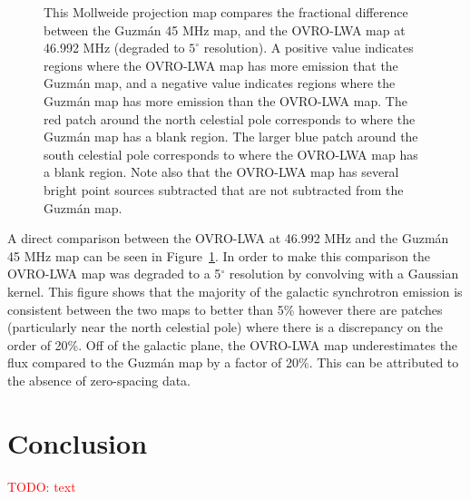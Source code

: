 \documentclass[twocolumn]{aastex61}
\newcommand{\todo}[1]{\textcolor{red}{TODO: #1}\PackageWarning{TODO:}{#1!}}
\begin{document}
\begin{figure}[t]
    \caption{
        This Mollweide projection map compares the fractional difference between the Guzm\'{a}n 45
        MHz map, and the OVRO-LWA map at 46.992 MHz (degraded to $5^\circ$ resolution). A positive
        value indicates regions where the OVRO-LWA map has more emission that the Guzm\'{a}n map,
        and a negative value indicates regions where the Guzm\'{a}n map has more emission than the
        OVRO-LWA map. The red patch around the north celestial pole corresponds to where the
        Guzm\'{a}n map has a blank region.  The larger blue patch around the south celestial pole
        corresponds to where the OVRO-LWA map has a blank region. Note also that the OVRO-LWA map
        has several bright point sources subtracted that are not subtracted from the Guzm\'{a}n map.
    }
    \label{fig:guzman-comparison}
\end{figure}

A direct comparison between the OVRO-LWA at 46.992 MHz and the Guzm\'{a}n 45 MHz map
\citep{2011A&A...525A.138G} can be seen in Figure~\ref{fig:guzman-comparison}. In order to make this
comparison the OVRO-LWA map was degraded to a 5$^\circ$ resolution by convolving with a Gaussian
kernel.  This figure shows that the majority of the galactic synchrotron emission is consistent
between the two maps to better than 5\% however there are patches (particularly near the north
celestial pole) where there is a discrepancy on the order of 20\%.  Off of the galactic plane, the
OVRO-LWA map underestimates the flux compared to the Guzm\'{a}n map by a factor of 20\%. This can be
attributed to the absence of zero-spacing data.


\section{Conclusion}

\todo{text}



\end{document}
